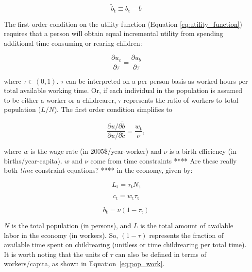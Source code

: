 \documentclass[letterpaper,12pt]{article}
\begin{document}
\begin{equation} \label{eq:b_tilde}
	\tilde b_\mathrm{t} \equiv b_\mathrm{t} - \bar b
\end{equation}

The first order condition on the utility function (Equation \ref{eq:utility_function}) requires that a person will obtain equal incremental utility from spending additional time consuming or rearing children:

\begin{equation} \label{eq:first_order_condition_def}
	\frac{\partial u_{c}}{\partial \tau} = \frac{\partial u_{b}}{\partial \tau}
\end{equation}

\noindent where $\tau \in (0,1)$. $\tau$ can be interpreted on a per-person basis as worked hours per total available working time. Or, if each individual in the population is assumed to be either a worker or a childrearer, $\tau$ represents the ratio of workers to total population ($L/N$). The first order condition simplifies to 

\begin{equation} \label{eq:first_order_condition_simplified}
	\frac{\partial u/ \partial\tilde b}{\partial u/ \partial\tilde c} = \frac{w_\mathrm{t}}{\nu},
\end{equation}

\noindent where $w$ is the wage rate (in 2005\$/year-worker) and $\nu$ is a birth efficiency (in births/year-capita). $w$ and $\nu$ come from time constraints **** Are these really both \emph{time} constraint equations? **** in the economy, given by:

\begin{equation}\label{eq:pop_work}
	L_\mathrm{t} = \tau_\mathrm{t} N_\mathrm{t}
\end{equation}

\begin{equation} \label{eq:consumption_constraint}
	c_\mathrm{t} = w_\mathrm{t} \tau_\mathrm{t}
\end{equation}

\begin{equation} \label{eq:birth_constraint}
	b_\mathrm{t} = \nu (1-\tau_\mathrm{t})
\end{equation}

\noindent $N$ is the total population (in persons), and $L$ is the total amount of available labor in the economy (in workers). So, $(1-\tau)$ represents the fraction of available time spent on childrearing (unitless or time childrearing per total time). It is worth noting that the units of $\tau$ can also be defined in terms of workers/capita, as shown in Equation~\ref{eq:pop_work}.
\end{document}
